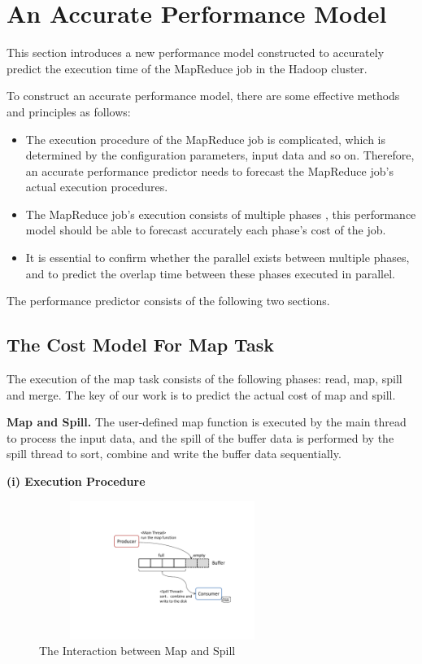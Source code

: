 \section{An Accurate Performance Model}
This section introduces a new performance model constructed to accurately predict the execution time of the MapReduce job in the Hadoop cluster.

To construct an accurate performance model, there are some effective methods and principles as follows:
\begin{itemize}
\item The execution procedure of the MapReduce job is complicated, which is determined by the configuration parameters, input data and so on. Therefore, an accurate performance predictor needs to forecast the MapReduce job's actual execution procedures.
\item The MapReduce job's execution consists of multiple phases , this performance model should be able to forecast accurately each phase's cost of the job.
\item It is essential to confirm whether the parallel exists between multiple phases, and to predict the overlap time between these phases executed in parallel.
\end{itemize}

The performance predictor consists of the following two sections.

\subsection{The Cost Model For Map Task}
The execution of the map task consists of the following phases: read, map, spill and merge. The key of our work is to predict the actual cost of map and spill.

\noindent\textbf{Map and Spill. }The user-defined map function is executed by the main thread to process the input data, and the spill of the buffer data is performed by the spill thread to sort, combine and write the buffer data sequentially.

\noindent\textbf{(i) Execution Procedure}
\begin{figure}[htbp]
\centering
\includegraphics[height=4.5cm, width=8cm]{mapandspill}
\caption{The Interaction between Map and Spill}
\label{fig:inter}
\end{figure}

